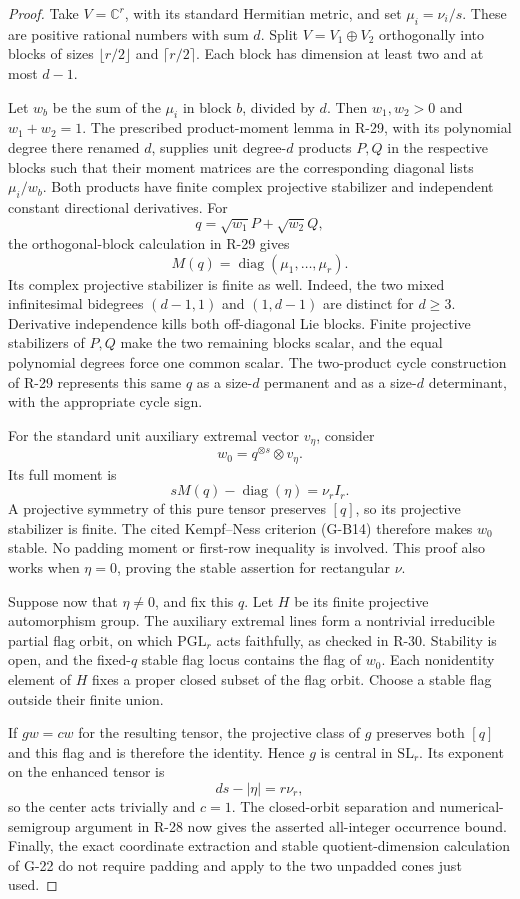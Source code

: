 \begin{proof}
Take $V=\mathbb C^r$, with its standard Hermitian metric,
and set $\mu_i=\nu_i/s$. These are positive rational
numbers with sum $d$. Split $V=V_1\oplus V_2$ orthogonally
into blocks of sizes $\lfloor r/2\rfloor$ and
$\lceil r/2\rceil$. Each block has dimension at least two
and at most $d-1$.

Let $w_b$ be the sum of the $\mu_i$ in block $b$, divided
by $d$. Then $w_1,w_2>0$ and $w_1+w_2=1$. The prescribed
product-moment lemma in R-29, with its polynomial degree
there renamed $d$, supplies unit degree-$d$ products $P,Q$
in the respective blocks such that their moment matrices
are the corresponding diagonal lists $\mu_i/w_b$.
Both products have finite complex projective stabilizer
and independent constant directional derivatives.
For
\[
                   q=\sqrt{w_1}P+\sqrt{w_2}Q,
\]
the orthogonal-block calculation in R-29 gives
\[
                  M(q)=\operatorname{diag}(\mu_1,\ldots,\mu_r).
\]
Its complex projective stabilizer is finite as well. Indeed,
the two mixed infinitesimal bidegrees $(d-1,1)$ and
$(1,d-1)$ are distinct for $d\geq3$. Derivative independence
kills both off-diagonal Lie blocks. Finite projective
stabilizers of $P,Q$ make the two remaining blocks scalar,
and the equal polynomial degrees force one common scalar.
The two-product cycle construction of R-29 represents this
same $q$ as a size-$d$ permanent and as a size-$d$ determinant,
with the appropriate cycle sign.

For the standard unit auxiliary extremal vector $v_\eta$,
consider
\[
                    w_0=q^{\otimes s}\otimes v_\eta.
\]
Its full moment is
\[
 sM(q)-\operatorname{diag}(\eta)=\nu_r I_r.
\]
A projective symmetry of this pure tensor preserves $[q]$,
so its projective stabilizer is finite. The cited
Kempf--Ness criterion (G-B14) therefore makes $w_0$ stable.
No padding moment or first-row inequality is involved.
This proof also works when $\eta=0$, proving the stable
assertion for rectangular $\nu$.

Suppose now that $\eta\ne0$, and fix this $q$. Let $H$ be
its finite projective automorphism group. The auxiliary
extremal lines form a nontrivial irreducible partial flag
orbit, on which $\mathrm{PGL}_r$ acts faithfully, as checked
in R-30. Stability is open, and the fixed-$q$ stable flag
locus contains the flag of $w_0$. Each nonidentity element
of $H$ fixes a proper closed subset of the flag orbit.
Choose a stable flag outside their finite union.

If $gw=cw$ for the resulting tensor, the projective class
of $g$ preserves both $[q]$ and this flag and is therefore
the identity. Hence $g$ is central in $\mathrm{SL}_r$.
Its exponent on the enhanced tensor is
\[
                       ds-|\eta|=r\nu_r,
\]
so the center acts trivially and $c=1$. The closed-orbit
separation and numerical-semigroup argument in R-28 now
gives the asserted all-integer occurrence bound. Finally,
the exact coordinate extraction and stable quotient-dimension
calculation of G-22 do not require padding and apply to the
two unpadded cones just used.
\end{proof}

